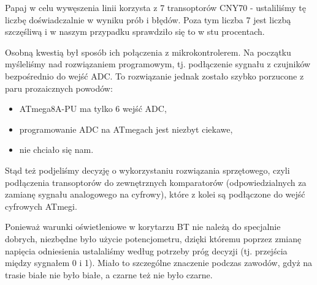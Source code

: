 Papaj w celu wywęszenia linii korzysta z 7 transoptorów CNY70 - ustaliliśmy tę liczbę doświadczalnie w wyniku prób i błędów. Poza tym liczba 7 jest liczbą szczęśliwą i w naszym przypadku sprawdziło się to w stu procentach.

Osobną kwestią był sposób ich połączenia z mikrokontrolerem. Na początku myśleliśmy nad rozwiązaniem programowym, tj. podłączenie sygnału z czujników bezpośrednio do wejść ADC. To rozwiązanie jednak zostało szybko porzucone z paru prozaicznych powodów:
\begin{itemize}
\item ATmega8A-PU ma tylko 6 wejść ADC,
\item programowanie ADC na ATmegach jest niezbyt ciekawe,
\item nie chciało się nam.
\end{itemize}

Stąd też podjeliśmy decyzję o wykorzystaniu rozwiązania sprzętowego, czyli podłączenia transoptorów do zewnętrznych komparatorów (odpowiedzialnych za zamianę sygnału analogowego na cyfrowy), które z kolei są podłączone do wejść cyfrowych ATmegi. 

Ponieważ warunki oświetleniowe w korytarzu BT nie należą do specjalnie dobrych, niezbędne było użycie potencjometru, dzięki któremu poprzez zmianę napięcia odniesienia ustalaliśmy według potrzeby próg decyzji (tj. przejścia między sygnałem 0 i 1). Miało to szczególne znaczenie podczas zawodów, gdyż na trasie białe nie było białe, a czarne też nie było czarne. 